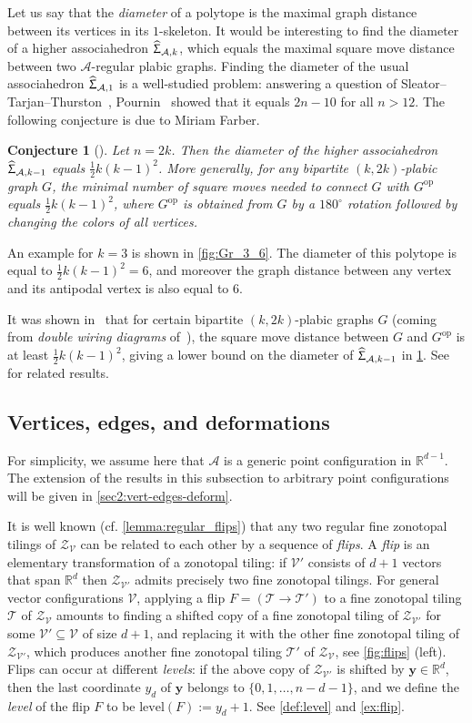 \documentclass[11pt]{amsart}
\theoremstyle{plain}
\newtheorem{conjecture}[theorem]{Conjecture}
\theoremstyle{definition}
\def\R{\mathbb{R}}
\def\y{{\bm{y}}}
\def\A{\mathcal{A}}
\def\V{\mathcal{V}}
\def\Zon{\mathcal{Z}}
\def\ZV{\Zon_\V}
\def\level{\mathrm{level}}
\def\HSP{\widehat\Upsigma}
\def\Sigma{\HSP}
\def\VC{\V}
\def\Tcal{\mathcal{T}}
\def\Tiling{\Tcal}
\let\subset\subseteq
\begin{document}
\def\opp{{\operatorname{op}}}
Let us say that the \emph{diameter} of a polytope is the maximal graph distance between its vertices in its $1$-skeleton. It would be interesting to find the diameter of a higher associahedron $\Sigma_{\A,k}$, which equals the maximal square move distance between two $\A$-regular plabic graphs. Finding the diameter of the usual associahedron $\Sigma_{\A,1}$ is a well-studied problem: answering a question of Sleator--Tarjan--Thurston~\cite{STT}, Pournin~\cite{Pournin} showed that it equals $2n-10$ for all $n>12$. The following conjecture is due to Miriam Farber.  
\begin{conjecture}[\cite{Miriam}]\label{conj:Miriam}
Let $n=2k$. Then the diameter of the higher associahedron $\Sigma_{\A,k-1}$ equals $\frac12 k(k-1)^2$. More generally, for any bipartite $(k,2k)$-plabic graph $G$, the minimal number of square moves needed to connect $G$ with $G^\opp$ equals $\frac12 k(k-1)^2$, where $G^\opp$ is obtained from $G$ by a $180^\circ$ rotation followed by changing the colors of all vertices.
\end{conjecture}
\noindent An example for $k=3$ is shown in \cref{fig:Gr_3_6}. The diameter of this polytope is equal to $\frac12 k(k-1)^2=6$, and moreover the graph distance between any vertex and its antipodal vertex is also equal to $6$.

It was shown in~\cite[Section~6]{BW1} that for certain bipartite $(k,2k)$-plabic graphs $G$ (coming from \emph{double wiring diagrams} of~\cite{FZDouble}), the square move distance between $G$ and $G^\opp$ is at least $\frac12 k(k-1)^2$, giving a lower bound on the diameter of $\Sigma_{\A,k-1}$ in \cref{conj:Miriam}. See~\cite{BW2} for related results. 

\subsection{Vertices, edges, and deformations}\label{sec:vert-edges-deform}
For simplicity, we assume here that $\A$ is a generic point configuration in $\R^{d-1}$. The extension of the results in this subsection to arbitrary point configurations will be given in 
\cref{sec2:vert-edges-deform}.

It is well known (cf. \cref{lemma:regular_flips}) that any two regular fine zonotopal tilings of $\ZV$ can be related to each other by a sequence of \emph{flips}. A \emph{flip} is an elementary transformation of a zonotopal tiling: if $\VC'$ consists of $d+1$ vectors that span $\R^d$ then $\Zon_{\VC'}$ admits precisely two fine zonotopal tilings. For general vector configurations $\VC$,
applying a flip $F=(\Tiling\to\Tiling')$ to a fine zonotopal tiling $\Tiling$ of $\ZV$ amounts to finding a shifted copy of a fine zonotopal tiling of $\Zon_{\VC'}$ for some $\VC'\subset \VC$ of size $d+1$, and replacing it with the other fine zonotopal tiling of $\Zon_{\VC'}$, which produces another fine zonotopal tiling $\Tiling'$ of $\ZV$,  see  \cref{fig:flips} (left). Flips can occur at different \emph{levels}: if 
the above copy of $\Zon_{\VC'}$ is shifted by $\y\in\R^d$,
then the last coordinate $y_d$ of $\y$ belongs to $\{0,1,\dots,n-d-1\}$, and we define the \emph{level} of the flip $F$ to be $\level(F):=y_d+1$. 
See \cref{def:level} and \cref{ex:flip}.
\end{document}
